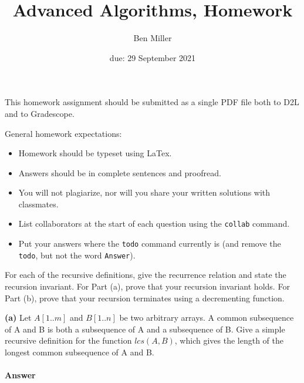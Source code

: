 \documentclass{article}
\title{Advanced Algorithms, Homework \hwnum}
\author{Ben Miller}
\date{due: 29 September 2021}
\begin{document}
\maketitle

This homework assignment should be
submitted as a single PDF file both to D2L and to Gradescope.

General homework expectations:
\begin{itemize}
    \item Homework should be typeset using LaTex.
    \item Answers should be in complete sentences and proofread.
    \item You will not plagiarize, nor will you share your written solutions
        with classmates.
    \item List collaborators at the start of each question using the
        \texttt{collab} command.
    \item Put your answers where the \texttt{todo} command currently is (and
        remove the \texttt{todo}, but not the word \texttt{Answer}).
\end{itemize}



\collab{}



For each of the recursive definitions, give the recurrence
relation and state the recursion invariant.  For Part (a), prove that your
recursion invariant holds.  For Part (b), prove that your recursion terminates
using a decrementing function.


{\bf  (a)} Let $A[1.. m]$ and $B[1.. n]$ be two arbitrary arrays. A common subsequence
of A and B is both a subsequence of A and a subsequence of B. Give
a simple recursive definition for the function $lcs(A, B)$, which gives the
length of the longest common subsequence of A and B.

\paragraph{Answer}

\todo{}


\end{document}
